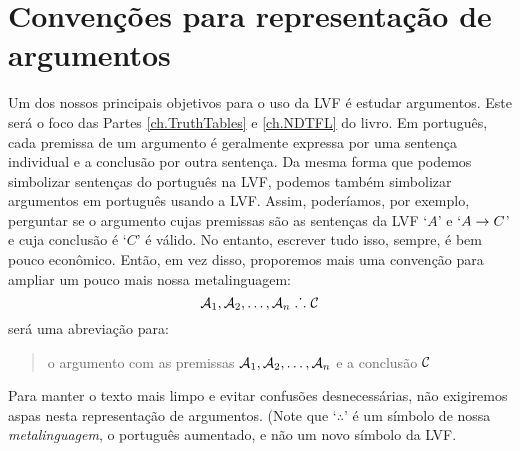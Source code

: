 \section{Convenções para representação de argumentos}
Um dos nossos principais objetivos para o uso da LVF é estudar argumentos. Este será o foco das Partes \ref{ch.TruthTables} e \ref{ch.NDTFL} do livro.
Em português, cada premissa de um argumento é geralmente expressa por uma sentença individual e a conclusão por outra sentença.
Da mesma forma que podemos simbolizar sentenças do português na LVF, podemos também simbolizar argumentos em português usando a LVF.
Assim, poderíamos, por exemplo, perguntar se o argumento cujas premissas são as sentenças da LVF `$A$' e `$A \rightarrow C$' e cuja conclusão é `$C$' é válido.
No entanto, escrever tudo isso, sempre, é bem pouco econômico.
Então, em vez disso, proporemos mais uma convenção para ampliar um pouco mais nossa metalinguagem:
	$$\mathcal{A}_1, \mathcal{A}_2, \ldots, \mathcal{A}_n \mathrel{\ldotp\dot{}\,\ldotp} \mathcal{C}$$
será uma abreviação para:
	\begin{quote}
		o argumento com as premissas $\mathcal{A}_1, \mathcal{A}_2, \ldots, \mathcal{A}_n$ e a conclusão $\mathcal{C}$
	\end{quote}
Para manter o texto mais limpo e evitar confusões desnecessárias, não exigiremos aspas nesta representação de argumentos.
(Note que `$\therefore$' é um símbolo de nossa \emph{metalinguagem}, o português aumentado, e não um novo símbolo da LVF.